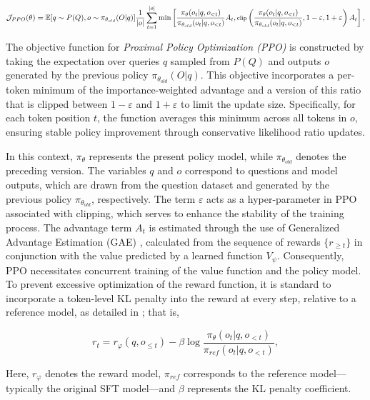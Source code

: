\begin{itemize}[topsep=0pt]
\begin{itemize}[topsep=0pt]
\begin{equation}
\footnotesize
    \mathcal{J}_{PPO}(\theta) = \mathbb{E}{[q \sim P(Q), o \sim \pi_{\theta_{old}}(O|q)]} \frac{1}{|o|} \sum_{t=1}^{|o|} \min \left[ \frac{\pi_\theta(o_{t} | q, o_{<t})}{\pi_{\theta_{old}}(o_{t} | q, o_{<t})} A_{t}, \text{clip} \left( \frac{\pi_\theta(o_{t} | q, o_{<t})}{\pi_{\theta_{old}}(o_{t} | q, o_{<t})}, 1 - \varepsilon, 1 + \varepsilon \right)  A_{t} \right] ,
\end{equation}

The objective function for \textit{Proximal Policy Optimization (PPO)} is constructed by taking the expectation over queries $q$ sampled from $P(Q)$ and outputs $o$ generated by the previous policy $\pi_{\theta_{old}}(O|q)$. This objective incorporates a per-token minimum of the importance-weighted advantage and a version of this ratio that is clipped between $1 - \varepsilon$ and $1 + \varepsilon$ to limit the update size. Specifically, for each token position $t$, the function averages this minimum across all tokens in $o$, ensuring stable policy improvement through conservative likelihood ratio updates.

In this context, $\pi_{\theta}$ represents the present policy model, while $\pi_{\theta_{old}}$ denotes the preceding version. The variables $q$ and $o$ correspond to questions and model outputs, which are drawn from the question dataset and generated by the previous policy $\pi_{\theta_{old}}$, respectively. The term $\varepsilon$ acts as a hyper-parameter in PPO associated with clipping, which serves to enhance the stability of the training process. The advantage term $A_t$ is estimated through the use of Generalized Advantage Estimation (GAE) \citep{gae}, calculated from the sequence of rewards $\{r_{\ge t}\}$ in conjunction with the value predicted by a learned function $V_{\psi}$. Consequently, PPO necessitates concurrent training of the value function and the policy model. To prevent excessive optimization of the reward function, it is standard to incorporate a token-level KL penalty into the reward at every step, relative to a reference model, as detailed in \citep{ouyang2022training}; that is,

\begin{equation}
    r_{t} = r_\varphi(q, o_{\le t}) - \beta \log\frac{\pi_{\theta}(o_{t}|q, o_{<t})}{\pi_{ref}(o_{t}|q, o_{<t})},
\label{eq:PPO-reward}
\end{equation}

Here, $r_\varphi$ denotes the reward model, $\pi_{ref}$ corresponds to the reference model—typically the original SFT model—and $\beta$ represents the KL penalty coefficient.


\end{itemize}
\end{itemize}
